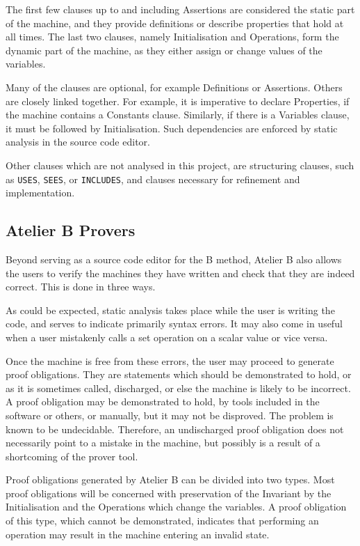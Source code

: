 \documentclass[12pt,journal,duplex]{IEEEtran}
\begin{document}
	The first few clauses up to and including Assertions are considered the static part of the machine, and they provide definitions or describe properties that hold at all times. The last two clauses, namely Initialisation and Operations, form the dynamic part of the machine, as they either assign or change values of the variables.

	Many of the clauses are optional, for example Definitions or Assertions. Others are closely linked together. For example, it is imperative to declare Properties, if the machine contains a Constants clause. Similarly, if there is a Variables clause, it must be followed by Initialisation. Such dependencies are enforced by static analysis in the source code editor.

	Other clauses which are not analysed in this project, are structuring clauses, such as \texttt{USES}, \texttt{SEES}, or \texttt{INCLUDES}, and clauses necessary for refinement and implementation.

	\subsection{Atelier B Provers}
	Beyond serving as a source code editor for the B method, Atelier B also allows the users to verify the machines they have written and check that they are indeed correct. This is done in three ways.

	As could be expected, static analysis takes place while the user is writing the code, and serves to indicate primarily syntax errors. It may also come in useful when a user mistakenly calls a set operation on a scalar value or vice versa.

	Once the machine is free from these errors, the user may proceed to generate proof obligations. They are statements which should be demonstrated to hold, or as it is sometimes called, discharged, or else the machine is likely to be incorrect. A proof obligation may be demonstrated to hold, by tools included in the software or others, or manually, but it may not be disproved. The problem is known to be undecidable\cite{sipser}. Therefore, an undischarged proof obligation does not necessarily point to a mistake in the machine, but possibly is a result of a shortcoming of the prover tool.

	Proof obligations generated by Atelier B can be divided into two types. Most proof obligations will be concerned with preservation of the Invariant by the Initialisation and the Operations which change the variables. A proof obligation of this type, which cannot be demonstrated, indicates that performing an operation may result in the machine entering an invalid state.
\end{document}
